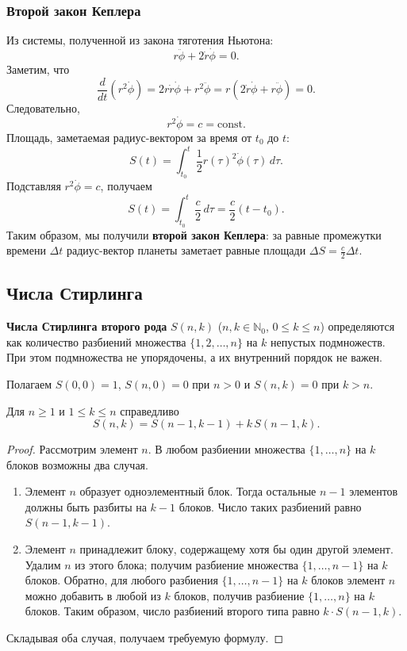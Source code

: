 \subsubsection{Второй закон Кеплера}
Из системы, полученной из закона тяготения Ньютона:
\[
r\ddot{\phi} + 2\dot{r}\dot{\phi} = 0.
\]
Заметим, что
\[
\frac{d}{dt}(r^2\dot{\phi}) = 2r\dot{r}\dot{\phi} + r^2\ddot{\phi} = r(2\dot{r}\dot{\phi} + r\ddot{\phi}) = 0.
\]
Следовательно,
\[
r^2\dot{\phi} = c = \text{const}.
\]
Площадь, заметаемая радиус-вектором за время от \(t_0\) до \(t\):
\[
S(t) = \int_{t_0}^{t} \frac12 r(\tau)^2 \dot{\phi}(\tau)\,d\tau.
\]
Подставляя \(r^2\dot{\phi} = c\), получаем
\[
S(t) = \int_{t_0}^{t} \frac{c}{2}\,d\tau = \frac{c}{2}(t - t_0).
\]
Таким образом, мы получили \textbf{второй закон Кеплера}: за равные промежутки времени \(\Delta t\) радиус-вектор планеты заметает равные площади \(\Delta S = \frac{c}{2}\Delta t\).

\subsection{Числа Стирлинга}

\begin{definition}
    \textbf{Числа Стирлинга второго рода} \(S(n,k)\) (\(n,k\in\mathbb{N}_0\), \(0\le k\le n\)) определяются как количество разбиений множества \(\{1,2,\dots,n\}\) на \(k\) непустых подмножеств. При этом подмножества не упорядочены, а их внутренний порядок не важен.
\end{definition}

Полагаем \(S(0,0)=1\), \(S(n,0)=0\) при \(n>0\) и \(S(n,k)=0\) при \(k>n\).

\begin{lemma}
    Для \(n\ge 1\) и \(1\le k\le n\) справедливо
    \[
    S(n,k)=S(n-1,k-1)+k\,S(n-1,k).
    \]
\end{lemma}
\begin{proof}
    Рассмотрим элемент \(n\). В любом разбиении множества \(\{1,\dots,n\}\) на \(k\) блоков возможны два случая.
    \begin{enumerate}
        \item Элемент \(n\) образует одноэлементный блок. Тогда остальные \(n-1\) элементов должны быть разбиты на \(k-1\) блоков. Число таких разбиений равно \(S(n-1,k-1)\).
        \item Элемент \(n\) принадлежит блоку, содержащему хотя бы один другой элемент. Удалим \(n\) из этого блока; получим разбиение множества \(\{1,\dots,n-1\}\) на \(k\) блоков. Обратно, для любого разбиения \(\{1,\dots,n-1\}\) на \(k\) блоков элемент \(n\) можно добавить в любой из \(k\) блоков, получив разбиение \(\{1,\dots,n\}\) на \(k\) блоков. Таким образом, число разбиений второго типа равно \(k\cdot S(n-1,k)\).
    \end{enumerate}
    Складывая оба случая, получаем требуемую формулу.
\end{proof}

